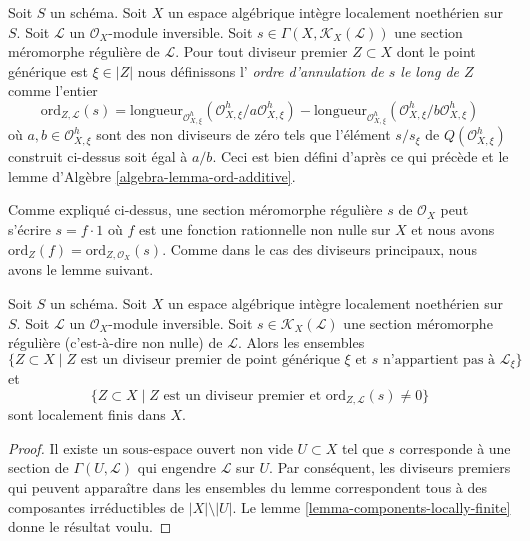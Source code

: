 \begin{definition}
\label{definition-order-vanishing-meromorphic}
Soit $S$ un schéma. Soit $X$ un espace algébrique intègre localement noethérien
sur $S$. Soit $\mathcal{L}$ un
$\mathcal{O}_X$-module inversible.
Soit $s \in \Gamma(X, \mathcal{K}_X(\mathcal{L}))$
une section méromorphe régulière de $\mathcal{L}$.
Pour tout diviseur premier $Z \subset X$ dont le point générique est $\xi \in |Z|$
nous définissons l'
{\it ordre d'annulation de $s$ le long de $Z$}
comme l'entier
$$
\text{ord}_{Z, \mathcal{L}}(s) =
\text{longueur}_{\mathcal{O}_{X, \xi}^h}
(\mathcal{O}_{X, \xi}^h/a \mathcal{O}_{X, \xi}^h) -
\text{longueur}_{\mathcal{O}_{X, \xi}^h}
(\mathcal{O}_{X, \xi}^h/b \mathcal{O}_{X, \xi}^h)
$$
où $a, b \in \mathcal{O}_{X, \xi}^h$ sont des non diviseurs de zéro
tels que l'élément $s/s_\xi$ de $Q(\mathcal{O}_{X, \xi}^h)$
construit ci-dessus soit égal à $a/b$.
Ceci est bien défini d'après ce qui précède et
le lemme d'Algèbre \ref{algebra-lemma-ord-additive}.
\end{definition}

\noindent
Comme expliqué ci-dessus, une section méromorphe régulière $s$ de $\mathcal{O}_X$
peut s'écrire $s = f \cdot 1$ où $f$
est une fonction rationnelle non nulle sur $X$ et nous avons
$\text{ord}_Z(f) = \text{ord}_{Z, \mathcal{O}_X}(s)$.
Comme dans le cas des diviseurs principaux, nous avons le lemme suivant.

\begin{lemma}
\label{lemma-divisor-meromorphic-locally-finite}
Soit $S$ un schéma. Soit $X$ un espace algébrique intègre localement noethérien
sur $S$. Soit $\mathcal{L}$ un $\mathcal{O}_X$-module inversible.
Soit $s \in \mathcal{K}_X(\mathcal{L})$ une
section méromorphe régulière (c'est-à-dire non nulle) de $\mathcal{L}$. Alors les ensembles
$$
\{Z \subset X \mid Z \text{ est un diviseur premier de point générique }\xi
\text{ et }s\text{ n'appartient pas à }\mathcal{L}_\xi\}
$$
et
$$
\{Z \subset X \mid Z \text{ est un diviseur premier et }
\text{ord}_{Z, \mathcal{L}}(s) \not = 0\}
$$
sont localement finis dans $X$.
\end{lemma}

\begin{proof}
Il existe un sous-espace ouvert non vide $U \subset X$ tel que $s$
corresponde à une section de $\Gamma(U, \mathcal{L})$ qui engendre
$\mathcal{L}$ sur $U$. Par conséquent, les diviseurs premiers qui peuvent apparaître
dans les ensembles du lemme correspondent tous à des composantes irréductibles de
$|X| \setminus |U|$. Le lemme \ref{lemma-components-locally-finite}
donne le résultat voulu.
\end{proof}

